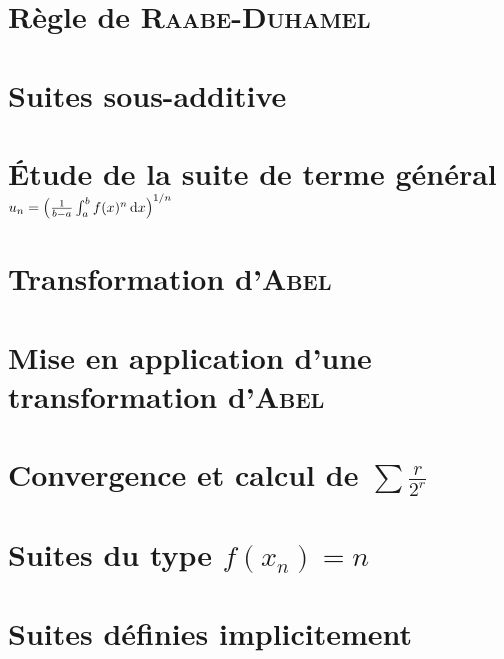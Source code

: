 \section{Règle de \textsc{Raabe-Duhamel}}


\section{Suites sous-additive}


\section{Étude de la suite de terme général \texorpdfstring{$u_n = \left( \frac{1}{b-a} \int_{a}^{b} f(x)^n \, \mathrm{d} x \right)^{1/n}$}{égal à une intégrale}}


\section{Transformation d'\textsc{Abel}} \label{transformation_abel}


\section{Mise en application d'une transformation d'\textsc{Abel} \cite{rms}}


\section{Convergence et calcul de  \texorpdfstring{$\sum \frac{r}{2^r}$}{de la série de terme général r/2^r}}


\section{Suites du type \texorpdfstring{$f(x_n) = n$}{f(x_n) = n}}


\section{Suites définies implicitement}

